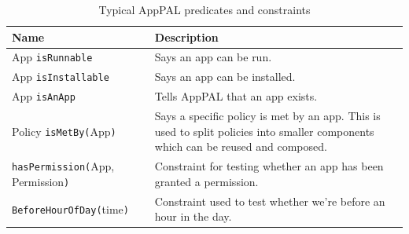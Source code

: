 \documentclass[]{llncs}
\begin{document}
\begin{table}
\begin{tabulary}{\linewidth}{l L}
  \toprule
  Name & Description \\
  \midrule
  App \texttt{isRunnable} & Says an app can be run. \\
  App \texttt{isInstallable} & Says an app can be installed. \\
  App \texttt{isAnApp} & Tells AppPAL that an app exists. \\
  Policy \texttt{isMetBy(}App\texttt{)} & Says a specific policy is met by an app.  This is used to split policies into smaller components which can be reused and composed. \\
  \texttt{hasPermission(}App, Permission\texttt{)} & Constraint for testing whether an app has been granted a permission. \\
  \texttt{BeforeHourOfDay(}time\texttt{)} & Constraint used to test whether we're before an hour in the day. \\
  \bottomrule
\end{tabulary}
\caption{Typical AppPAL predicates and constraints}
\label{tab:predicates}
\end{table}



%
%
%
\end{document}
